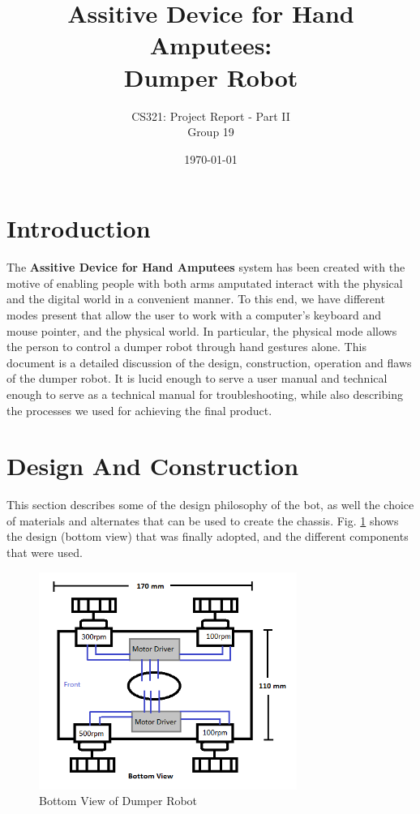 \documentclass[a4paper]{article}
\title{Assitive Device for Hand Amputees: \\ Dumper Robot}
\author{CS321: Project Report - Part II \\ Group 19}
\date{\today}
\begin{document}
\maketitle

\section{Introduction}
\label{sec:introduction}

The \textbf{Assitive Device for Hand Amputees} system has been created with the motive of enabling people with both arms amputated interact with the physical and the digital world in a convenient manner. To this end, we have different modes present that allow the user to work with a computer's keyboard and mouse pointer, and the physical world. In particular, the physical mode allows the person to control a dumper robot through hand gestures alone. This document is a detailed discussion of the design, construction, operation and flaws of the dumper robot. It is lucid enough to serve a user manual and technical enough to serve as a technical manual for troubleshooting, while also describing the processes we used for achieving the final product.

\section{Design And Construction}

This section describes some of the design philosophy of the bot, as well the choice of materials and alternates that can be used to create the chassis. Fig. \ref{fig:bot_design} shows the design (bottom view) that was finally adopted, and the different components that were used.

\begin{figure}
\label{fig:bot_design}
\centering
\includegraphics[width=0.75\textwidth]{bot_bottom.png}
\caption{Bottom View of Dumper Robot}
\end{figure}
\end{document}
